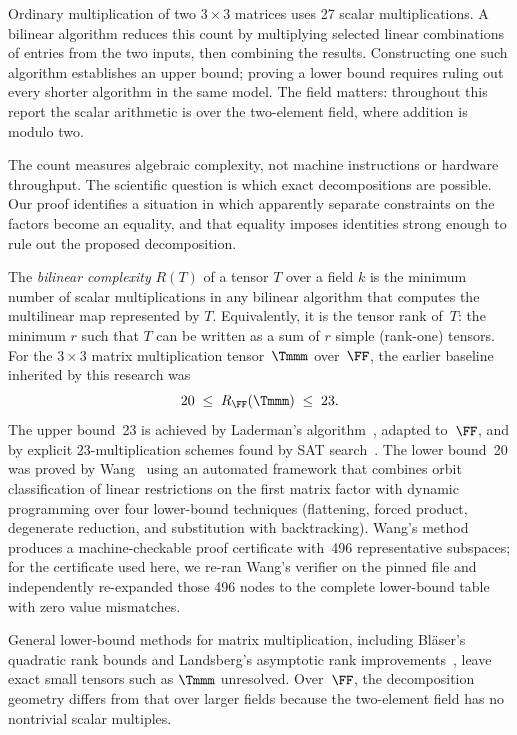 \documentclass[11pt,a4paper]{article}
\begin{document}
Ordinary multiplication of two $3\times3$ matrices uses 27 scalar
multiplications. A bilinear algorithm reduces this count by multiplying selected
linear combinations of entries from the two inputs, then combining the
results. Constructing one such algorithm establishes an upper bound;
proving a lower bound requires ruling out every shorter algorithm in the
same model. The field matters: throughout this report the scalar arithmetic
is over the two-element field, where addition is modulo two.

The count measures algebraic complexity, not machine instructions or
hardware throughput. The scientific question is which exact decompositions
are possible. Our proof identifies a situation in which apparently separate
constraints on the factors become an equality, and that equality imposes
identities strong enough to rule out the proposed decomposition.

The \emph{bilinear complexity} $R(T)$ of a tensor $T$ over a field $k$ is the minimum number of scalar multiplications in any bilinear algorithm that computes the multilinear map represented by $T$.  Equivalently, it is the tensor rank of~$T$: the minimum $r$ such that $T$ can be written as a sum of $r$ simple (rank-one) tensors. For the $3\times3$ matrix multiplication tensor~$\Tmmm$ over~$\FF$, the earlier baseline inherited by this research was
\[
  20\;\le\;R_{\FF}(\Tmmm)\;\le\;23.
\]
The upper bound~23 is achieved by Laderman's algorithm~\cite{laderman1976noncommutative}, adapted to~$\FF$, and by explicit 23-multiplication schemes found by SAT search~\cite{heule2019waysa}.  The lower bound~20 was proved by Wang~\cite{wangautomated} using an automated framework that combines orbit classification of linear restrictions on the first matrix factor with dynamic programming over four lower-bound techniques (flattening, forced product, degenerate reduction, and substitution with backtracking).  Wang's method produces a machine-checkable proof certificate with~496 representative subspaces; for the certificate used here, we re-ran Wang's verifier on the pinned file and independently re-expanded those 496 nodes to the complete lower-bound table with zero value mismatches.

General lower-bound methods for matrix multiplication, including Bläser's quadratic rank bounds and Landsberg's asymptotic rank improvements~\cite{blaser1999focs,landsberg2012lower}, leave exact small tensors such as $\Tmmm$ unresolved. Over~$\FF$, the decomposition geometry differs from that over larger fields because the two-element field has no nontrivial scalar multiples.
\end{document}
